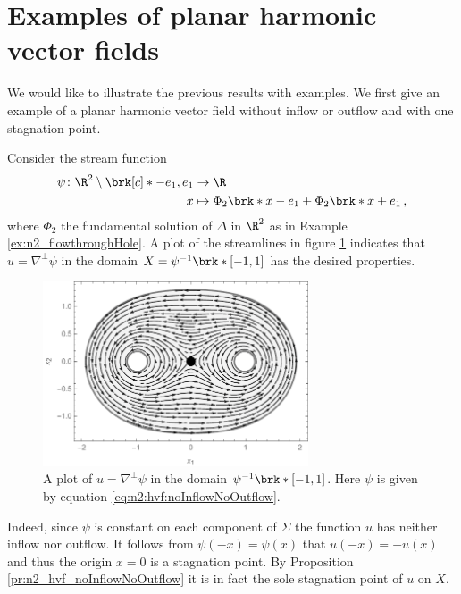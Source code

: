 \section{Examples of planar harmonic vector fields}

We would like to illustrate the previous results with examples.
We first give an example of a planar harmonic vector field without 
inflow or outflow and with one stagnation point.
\begin{example}[No in- or outflow]
  Consider the stream function
  \begin{equation}
    \begin{aligned}
    \psi\colon\R^2\setminus\brk[c]*{-e_1,e_1}&\to\R \\
    x&\mapsto\Phi_2\brk*{x-e_1}+\Phi_2\brk*{x+e_1}\,,
    \end{aligned}\label{eq:n2:hvf:noInflowNoOutflow}
  \end{equation}
  where $\Phi_2$ the fundamental solution of $\Delta$ in $\R^2$ as in Example \ref{ex:n2_flowthroughHole}.
  A plot of the streamlines in figure \ref{pl:n2_hvf_noInflowNoOutflow}
  indicates that $u=\nabla^\perp\psi$
  in the domain $X=\psi^{-1}\brk*{[-1,1]}$ has the desired properties.
  \begin{figure}
    \centering
    \includegraphics[width=0.7\textwidth]{../Plots/n2_hvf_noInflowNoOutflow_symmetric_gray_2.pdf}
    \caption{A plot of $u=\nabla^\perp\psi$ in the domain $\psi^{-1}\brk*{[-1,1]}$.
      Here $\psi$ is given by equation \eqref{eq:n2:hvf:noInflowNoOutflow}.}
    \label{pl:n2_hvf_noInflowNoOutflow}
  \end{figure}
  Indeed, since $\psi$ is constant on each component of $\Sigma$ the function $u$ has 
  neither inflow nor outflow.
  It follows from $\psi(-x)=\psi(x)$ that $u(-x)=-u(x)$ 
  and thus the origin $x=0$ is a stagnation point.
  By Proposition \ref{pr:n2_hvf_noInflowNoOutflow} it is in fact the
  sole stagnation point of $u$ on $X$.
\end{example}

